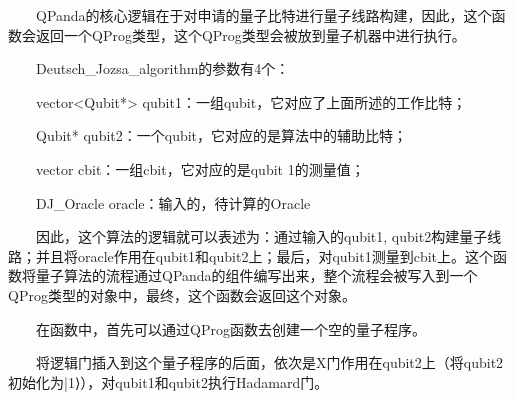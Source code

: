 \documentclass[a4paper,11pt,english]{sphinxmanual}
\begin{document}
\sphinxAtStartPar
  QPanda的核心逻辑在于对申请的量子比特进行量子线路构建，因此，这个函数会返回一个QProg类型，这个QProg类型会被放到量子机器中进行执行。

\sphinxAtStartPar
  Deutsch\_Jozsa\_algorithm的参数有4个：

\sphinxAtStartPar
​  vector<Qubit*> qubit1：一组qubit，它对应了上面所述的工作比特；

\sphinxAtStartPar
​  Qubit* qubit2：一个qubit，它对应的是算法中的辅助比特；

\sphinxAtStartPar
​  vector cbit：一组cbit，它对应的是qubit 1的测量值；

\sphinxAtStartPar
​  DJ\_Oracle oracle：输入的，待计算的Oracle

\sphinxAtStartPar
  因此，这个算法的逻辑就可以表述为：通过输入的qubit1, qubit2构建量子线路；并且将oracle作用在qubit1和qubit2上；最后，对qubit1测量到cbit上。这个函数将量子算法的流程通过QPanda的组件编写出来，整个流程会被写入到一个QProg类型的对象中，最终，这个函数会返回这个对象。

\begin{sphinxVerbatim}[commandchars=\\\{\}]
   
\end{sphinxVerbatim}

\sphinxAtStartPar
  在函数中，首先可以通过QProg函数去创建一个空的量子程序。

\begin{sphinxVerbatim}[commandchars=\\\{\}]
  
     
\end{sphinxVerbatim}

\sphinxAtStartPar
  将逻辑门插入到这个量子程序的后面，依次是X门作用在qubit2上（将qubit2初始化为|1⟩），对qubit1和qubit2执行Hadamard门。

\begin{sphinxVerbatim}[commandchars=\\\{\}]
   
\end{sphinxVerbatim}
\end{document}
